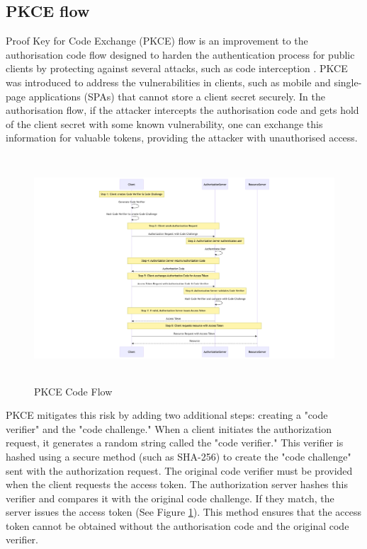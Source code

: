 \newpage
\subsection{PKCE flow}
\label{sec:pkce_flow}
Proof Key for Code Exchange (PKCE) flow is an improvement to the authorisation code flow designed to harden the authentication process for public clients by protecting against several attacks, such as code interception \citep{pkce}. PKCE was introduced to address the vulnerabilities in clients, such as mobile and single-page applications (SPAs) that cannot store a client secret securely. In the authorisation flow, if the attacker intercepts the authorisation code and gets hold of the client secret with some known vulnerability, one can exchange this information for valuable tokens, providing the attacker with unauthorised access. 


\begin{figure}[h!]
\centering
\caption{PKCE Code Flow}\label{fig:pkce_flow}
\includegraphics[width=\textwidth, height=320px]{pics/pkce.png}
\end{figure}

PKCE mitigates this risk by adding two additional steps: creating a "code verifier" and the "code challenge." When a client initiates the authorization request, it generates a random string called the "code verifier." This verifier is hashed using a secure method (such as SHA-256) to create the "code challenge" sent with the authorization request. The original code verifier must be provided when the client requests the access token. The authorization server hashes this verifier and compares it with the original code challenge. If they match, the server issues the access token (See Figure \ref{fig:pkce_flow}). This method ensures that the access token cannot be obtained without the authorisation code and the original code verifier. 

